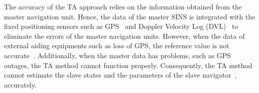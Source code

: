 \documentclass[3p]{elsarticle}
\begin{document}

The accuracy of the TA approach relies on the information obtained from the master navigation unit. Hence, the data of the master SINS is integrated with the fixed positioning sensors such as GPS~\cite{grewal2007integration} and Doppler Velocity Log (DVL)~\cite{titterton2004inertial} to eliminate the errors of the master navigation units. However, when the data of external aiding equipments such as loss of GPS, the reference value is not accurate~\cite{grewal2007integration}.
Additionally, when the master data has problems, such as GPS outages, the TA method cannot function properly.
Consequently, the TA method cannot estimate the slave states and the parameters of the slave navigator~\cite{gelb1974applied}, accurately.
\end{document}
